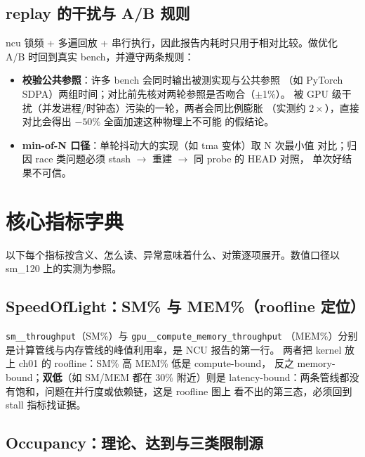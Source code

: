 \subsection{replay 的干扰与 A/B 规则}

ncu 锁频 + 多遍回放 + 串行执行，因此报告内耗时只用于相对比较。做优化 A/B
时回到真实 bench，并遵守两条规则：

\begin{itemize}
\item \textbf{校验公共参照}：许多 bench 会同时输出被测实现与公共参照
  （如 PyTorch SDPA）两组时间；对比前先核对两轮参照是否吻合（$\pm$1\%）。
  被 GPU 级干扰（并发进程/时钟态）污染的一轮，两者会同比例膨胀
  （实测约 $2\times$），直接对比会得出 $-50\%$ 全面加速这种物理上不可能
  的假结论。
\item \textbf{min-of-N 口径}：单轮抖动大的实现（如 tma 变体）取 N 次最小值
  对比；归因 race 类问题必须 stash $\to$ 重建 $\to$ 同 probe 的 HEAD 对照，
  单次好结果不可信。
\end{itemize}

\section{核心指标字典}\label{sec:ch00-metrics}

以下每个指标按含义、怎么读、异常意味着什么、对策逐项展开。数值口径以
sm\_120 上的实测为参照。

\subsection{SpeedOfLight：SM\% 与 MEM\%（roofline 定位）}

\texttt{sm\_\allowbreak{}\_\allowbreak{}throughput}（SM\%）与 \texttt{gpu\_\allowbreak{}\_\allowbreak{}compute\_\allowbreak{}memory\_\allowbreak{}throughput}
（MEM\%）分别是计算管线与内存管线的峰值利用率，是 NCU 报告的第一行。
两者把 kernel 放上 ch01 的 roofline：SM\% 高 MEM\% 低是 compute-bound，
反之 memory-bound；\textbf{双低}（如 SM/MEM 都在 30\% 附近）则是
latency-bound：两条管线都没有饱和，问题在并行度或依赖链，这是 roofline 图上
看不出的第三态，必须回到 stall 指标找证据。

\subsection{Occupancy：理论、达到与三类限制源}

